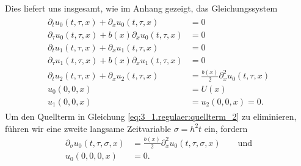 Dies liefert uns insgesamt, wie im Anhang gezeigt, das Gleichungssystem
\begin{align}
\begin{split}
\partial_t u_0(t, \tau, x) + \partial_x u_0(t, \tau, x) &= 0\\
\partial_\tau u_0(t, \tau, x) + b(x) \partial_x u_0(t, \tau, x) &= 0\\
\partial_t u_1(t, \tau, x) + \partial_x u_1(t, \tau, x) &= 0\\
\partial_\tau u_1(t, \tau, x) + b(x) \partial_x u_1(t, \tau, x) &= 0\\
\label{eq:3_1.regulaer:quellterm_2}
\partial_t u_2(t, \tau, x) + \partial_x u_2(t, \tau, x) &= \frac{b(x)}{2} \partial^2_x u_0(t, \tau,x)\\
u_0(0,0,x) &= U(x)\\
u_1(0,0,x) &= u_2(0,0,x) = 0.
\end{split}
\end{align}
Um den Quellterm in Gleichung \eqref{eq:3_1.regulaer:quellterm_2} zu eliminieren, führen wir eine zweite langsame Zeitvariable $\sigma = h^2 t$ ein, fordern
\begin{align}
\partial_\sigma u_0(t, \tau, \sigma, x) &= \frac{b(x)}{2} \partial^2_x u_0(t, \tau, \sigma, x) \qquad \text{und}\\
u_0(0, 0, 0, x) &= 0.
\end{align}